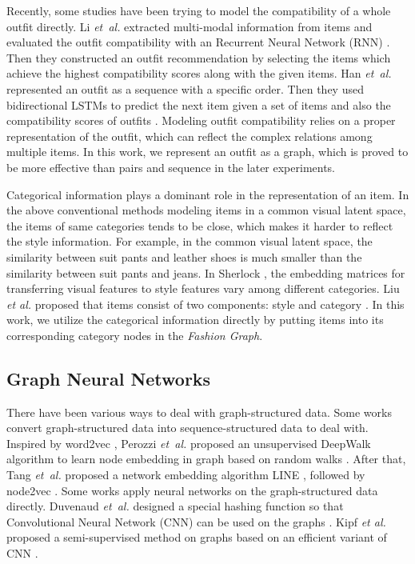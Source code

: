 \documentclass[sigconf]{acmart}
\begin{document}
Recently, some studies have been trying to model the compatibility of a whole outfit directly.
Li \emph{et~al.} extracted multi-modal information from items and evaluated the outfit compatibility with an Recurrent Neural Network (RNN) \cite{li2017mining}. Then they constructed an outfit recommendation by selecting the items which achieve the highest compatibility scores along with the given items.
Han \emph{et~al.} represented an outfit as a sequence with a specific order. Then they used bidirectional LSTMs to predict the next item given a set of items and also the compatibility scores of outfits \cite{han2017learning}.
Modeling outfit compatibility relies on a proper representation of the outfit, which can reflect the complex relations among multiple items. In this work, we represent an outfit as a graph, which is proved to be more effective than pairs and sequence in the later experiments.

Categorical information plays a dominant role in the representation of an item.
In the above conventional methods modeling items in a common visual latent space, the items of same categories tends to be close, which makes it harder to reflect the style information.
For example, in the common visual latent space, the similarity between suit pants and leather shoes is much smaller than the similarity between suit pants and jeans.
In Sherlock \cite{he2016sherlock}, the embedding matrices for transferring visual features to style features vary among different categories.
Liu \emph{et al.}  proposed that items consist of two components: style and category \cite{liu2017deepstyle}.
In this work, we utilize the categorical information directly by putting items into its corresponding category nodes in the \emph{Fashion Graph}.


\subsection{Graph Neural Networks}
There have been various ways to deal with graph-structured data. Some works convert graph-structured data into sequence-structured data to deal with. Inspired by word2vec \cite{mikolov2013distributed},
Perozzi \emph{et~al.} proposed an unsupervised DeepWalk algorithm to learn node embedding in graph based on random walks \cite{perozzi2014deepwalk}. After that, Tang \emph{et~al.} proposed a network embedding algorithm LINE \cite{tang2015line}, followed by node2vec \cite{Grover2016node2vec}.
Some works apply neural networks on the graph-structured data directly. Duvenaud \emph{et~al.} designed a special hashing function so that Convolutional Neural Network (CNN) can be used on the graphs \cite{duvenaud2015convolutional}.
Kipf \emph{et al.} proposed a semi-supervised method on graphs based on an efficient variant of CNN \cite{Kipf2016Semi}.
\end{document}
